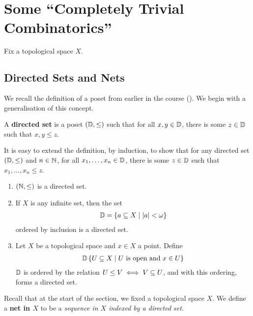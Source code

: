 \section{Some ``Completely Trivial Combinatorics''}

Fix a topological space $X$.

\subsection{Directed Sets and Nets}

We recall the definition of a poset from earlier in the course (). We begin with a generalisation of this concept.

\begin{boxdefinition}
    A \textbf{directed set} is a poset $\left( \mathbb{D}, \leq \right)$ such that for all $x, y \in \mathbb{D}$, there is some $z \in \mathbb{D}$ such that $x, y \leq z$.
\end{boxdefinition}

It is easy to extend the definition, by induction, to show that for any directed set $\left( \mathbb{D}, \leq \right)$ and $n \in \mathbb{N}$, for all $x_1, \ldots, x_n \in \mathbb{D}$, there is some $z \in \mathbb{D}$ such that $x_1, \ldots, x_n \leq z$.

\begin{boxexample}\label{Ch2:Eg:Dir_Sets}
    \hfill
    \begin{enumerate}
        \item $\left( \mathbb{N}, \leq \right)$ is a directed set.

        \item If $X$ is any infinite set, then the set
        \begin{align*}
            \mathbb{D} = \left\{ a \subseteq X \; \middle\vert \; \left\lvert a \right\rvert < \omega \right\}
        \end{align*}
        ordered by inclusion is a directed set.

        \item Let $X$ be a topological space and $x \in X$ a point. Define
        \begin{align*}
            \mathbb{D} \left\{ U \subseteq X \; \middle\vert \; U \text{ is open and } x \in U \right\}
        \end{align*}
        $\mathbb{D}$ is ordered by the relation $U \leq V \iff V \subseteq U$, and with this ordering, forms a directed set.
    \end{enumerate}
\end{boxexample}

Recall that at the start of the section, we fixed a topological space $X$. We define a \textbf{net in $X$} to be a \textit{sequence in $X$ indexed by a directed set}.

